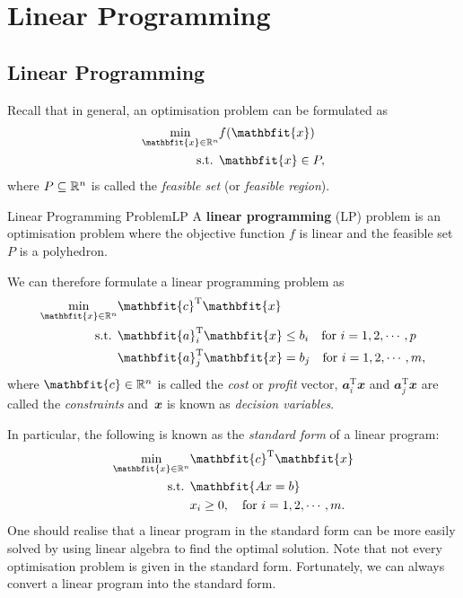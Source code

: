 \documentclass[math, code]{amznotes}
\theoremstyle{remark}
\begin{document}
\tableofcontents

\chapter{Linear Programming}
\section{Linear Programming}
Recall that in general, an optimisation problem can be formulated as
\begin{align*}
    \min_{\mathbfit{x} \in \R^n} & f(\mathbfit{x}) \\
    \textrm{s.t. } & \mathbfit{x} \in P,
\end{align*}
where $P \subseteq \mathbb{R}^n$ is called the \textit{feasible set} (or \textit{feasible region}).
\begin{dfnbox}{Linear Programming Problem}{LP}
    A {\color{red} \textbf{linear programming}} (LP) problem is an optimisation problem where the objective function $f$ is linear and the feasible set $P$ is a polyhedron.
\end{dfnbox}
We can therefore formulate a linear programming problem as
\begin{align*}
    \min_{\mathbfit{x} \in \R^n} & \mathbfit{c}^{\mathrm{T}}\mathbfit{x} \\
    \textrm{s.t. } & \mathbfit{a}_i^{\mathrm{T}}\mathbfit{x} \leq b_i \quad \textrm{for } i = 1, 2, \cdots, p \\
    & \mathbfit{a}_j^{\mathrm{T}}\mathbfit{x} = b_j \quad \textrm{for } i = 1, 2, \cdots, m,
\end{align*}
where $\mathbfit{c} \in \R^n$ is called the \textit{cost} or \textit{profit} vector, $\mathbfit{a}_i^{\mathrm{T}}\mathbfit{x}$ and $\mathbfit{a}_j^{\mathrm{T}}\mathbfit{x}$ are called the \textit{constraints} and~$\mathbfit{x}$ is known as \textit{decision variables}.

In particular, the following is known as the \textit{standard form} of a linear program:
\begin{align*}
    \min_{\mathbfit{x} \in \R^n} & \mathbfit{c}^{\mathrm{T}}\mathbfit{x} \\
    \textrm{s.t. } & \mathbfit{Ax = b} \\
    & x_i \geq 0, \quad \textrm{for } i = 1, 2, \cdots, m.
\end{align*}
One should realise that a linear program in the standard form can be more easily solved by using linear algebra to find the optimal solution. Note that not every optimisation problem is given in the standard form. Fortunately, we can always convert a linear program into the standard form.
\end{document}
